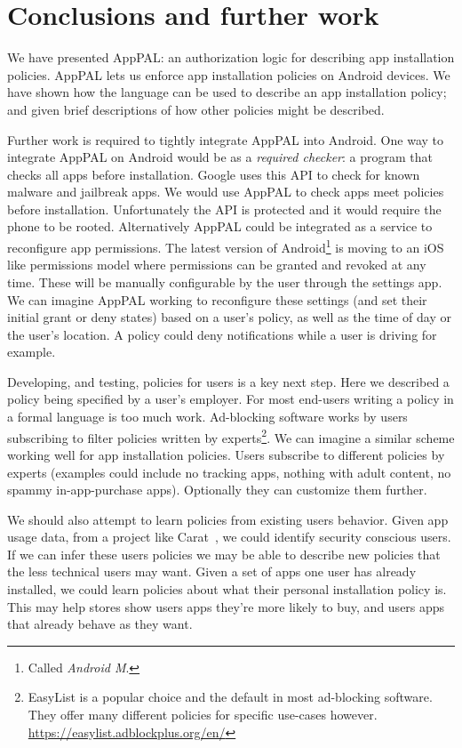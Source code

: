 \documentclass[]{llncs}
\begin{document}
\section{Conclusions and further work}

We have presented AppPAL: an authorization logic for describing app installation policies.
AppPAL lets us enforce app installation policies on Android devices.
We have shown how the language can be used to describe an app installation policy;
  and given brief descriptions of how other policies might be described.

Further work is required to tightly integrate AppPAL into Android.
One way to integrate AppPAL on Android would be as a \emph{required checker}: a program that checks all apps before installation.
Google uses this API to check for known malware and jailbreak apps.
We would use AppPAL to check apps meet policies before installation.
Unfortunately the API is protected and it would require the phone to be rooted.
Alternatively AppPAL could be integrated as a service to reconfigure app permissions.
The latest version of Android\footnote{Called \emph{Android M}.} is moving to an iOS like permissions model where permissions can be granted and revoked at any time.
These will be manually configurable by the user through the settings app.
We can imagine AppPAL working to reconfigure these settings (and set their initial grant or deny states) based on a user's policy, as well as the time of day or the user's location.
A policy could deny notifications while a user is driving for example.

Developing, and testing, policies for users is a key next step.
Here we described a policy being specified by a user's employer.
For most end-users writing a policy in a formal language is too much work.
Ad-blocking software works by users subscribing to filter policies written by experts\footnote{EasyList is a popular choice and the default in most ad-blocking software. They offer many different policies for specific use-cases however. \url{https://easylist.adblockplus.org/en/}}.
We can imagine a similar scheme working well for app installation policies.
Users subscribe to different policies by experts (examples could include no tracking apps, nothing with adult content, no spammy in-app-purchase apps).
Optionally they can customize them further.

We should also attempt to learn policies from existing users behavior.
Given app usage data, from a project like Carat~\cite{Oliner:2013ht}, we could identify security conscious users.
If we can infer these users policies we may be able to describe new policies that the less technical users may want.
Given a set of apps one user has already installed, we could learn policies about what their personal installation policy is.
This may help stores show users apps they're more likely to buy, and users apps that already behave as they want.
\end{document}
